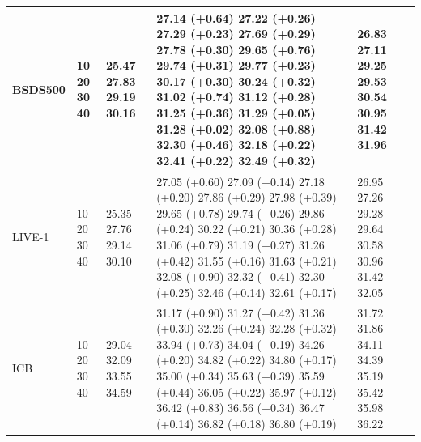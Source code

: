 \begin{tabular}{lllll}
\toprule
BSDS500 & 10 20 30 40 & 25.47 27.83 29.19 30.16 & 27.14 (+0.64) 27.22 (+0.26) 27.29 (+0.23) 27.69 (+0.29) 27.78 (+0.30) 29.65 (+0.76) 29.74 (+0.31) 29.77 (+0.23) 30.17 (+0.30) 30.24 (+0.32) 31.02 (+0.74) 31.12 (+0.28) 31.25 (+0.36) 31.29 (+0.05) 31.28 (+0.02) 32.08 (+0.88) 32.30 (+0.46) 32.18 (+0.22) 32.41 (+0.22) 32.49 (+0.32) & 26.83 27.11 29.25 29.53 30.54 30.95 31.42 31.96 \\
\midrule
LIVE-1 & 10 20 30 40 & 25.35 27.76 29.14 30.10 & 27.05 (+0.60) 27.09 (+0.14) 27.18 (+0.20) 27.86 (+0.29) 27.98 (+0.39) 29.65 (+0.78) 29.74 (+0.26) 29.86 (+0.24) 30.22 (+0.21) 30.36 (+0.28) 31.06 (+0.79) 31.19 (+0.27) 31.26 (+0.42) 31.55 (+0.16) 31.63 (+0.21) 32.08 (+0.90) 32.32 (+0.41) 32.30 (+0.25) 32.46 (+0.14) 32.61 (+0.17) & 26.95 27.26 29.28 29.64 30.58 30.96 31.42 32.05 \\
ICB & 10 20 30 40 & 29.04 32.09 33.55 34.59 & 31.17 (+0.90) 31.27 (+0.42) 31.36 (+0.30) 32.26 (+0.24) 32.28 (+0.32) 33.94 (+0.73) 34.04 (+0.19) 34.26 (+0.20) 34.82 (+0.22) 34.80 (+0.17) 35.00 (+0.34) 35.63 (+0.39) 35.59 (+0.44) 36.05 (+0.22) 35.97 (+0.12) 36.42 (+0.83) 36.56 (+0.34) 36.47 (+0.14) 36.82 (+0.18) 36.80 (+0.19) & 31.72 31.86 34.11 34.39 35.19 35.42 35.98 36.22 \\
\bottomrule
\end{tabular}
